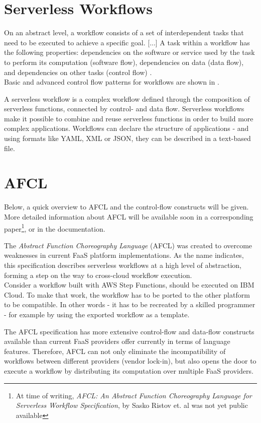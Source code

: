 \documentclass[a4paper,12pt,pdftex,halfparskip,cleardoubleempty,bibtotoc,liststotoc]{scrbook}
\begin{document}
\section{Serverless Workflows}
On an abstract level, a workflow consists of a set of interdependent tasks that need to be executed to achieve a specific goal. [...] A task within a workflow has the following properties: dependencies on the software or service used by the task to perform its computation (software flow), dependencies on data (data flow), and dependencies on other tasks (control flow) \cite{thesis-design-serverless-worfklow-system-eyk}.\\
Basic and advanced control flow patterns for workflows are shown in \cite{reports-workflow-control-patterns-russell}.

A serverless workflow is a complex workflow defined through the composition of serverless functions, connected by control- and data flow. Serverless workflows make it possible to combine and reuse serverless functions in order to build more complex applications. 
Workflows can declare the structure of applications - and using formats like YAML, XML or JSON, they can be described in a text-based file.

\section{AFCL}

Below, a quick overview to AFCL and the control-flow constructs will be given. More detailed information about AFCL will be available soon in a corresponding paper\footnote{At time of writing, \emph{AFCL: An Abstract Function Choreography Language for Serverless Workflow Specification}, by Sasko Ristov et. al was not yet public available}, or in the documentation.\cite{online-afcl-docs-dps}

The \emph{Abstract Function Choreography Language} (AFCL) was created to overcome weaknesses in current FaaS platform implementations. As the name indicates, this specification describes serverless workflows at a high level of abstraction, forming a step on the way to cross-cloud workflow execution.\\
Consider a workflow built with AWS Step Functions, should be executed on IBM Cloud. To make that work, the workflow has to be ported to the other platform to be compatible. In other words - it has to be recreated by a skilled programmer - for example by using the exported workflow as a template.

The AFCL specification has more extensive control-flow and data-flow constructs available than current FaaS providers offer currently in terms of language features. Therefore, AFCL can not only eliminate the incompatibility of workflows between different providers (vendor lock-in), but also opens the door to execute a workflow by distributing its computation over multiple FaaS providers.
\end{document}

